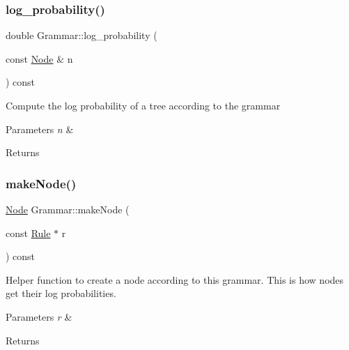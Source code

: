 \subsubsection{\texorpdfstring{log\+\_\+probability()}{log\_probability()}}
{\footnotesize\ttfamily double Grammar\+::log\+\_\+probability (\begin{DoxyParamCaption}\item[{const \hyperlink{class_node}{Node} \&}]{n }\end{DoxyParamCaption}) const\hspace{0.3cm}{\ttfamily [inline]}}

Compute the log probability of a tree according to the grammar 
\begin{DoxyParams}{Parameters}
{\em n} & \\
\hline
\end{DoxyParams}
\begin{DoxyReturn}{Returns}

\end{DoxyReturn}
\mbox{\label{class_grammar_a5d60795be5b288d74a87f2cc52008f71}} 
\subsubsection{\texorpdfstring{make\+Node()}{makeNode()}}
{\footnotesize\ttfamily \hyperlink{class_node}{Node} Grammar\+::make\+Node (\begin{DoxyParamCaption}\item[{const \hyperlink{class_rule}{Rule} $\ast$}]{r }\end{DoxyParamCaption}) const\hspace{0.3cm}{\ttfamily [inline]}}

Helper function to create a node according to this grammar. This is how nodes get their log probabilities. 
\begin{DoxyParams}{Parameters}
{\em r} & \\
\hline
\end{DoxyParams}
\begin{DoxyReturn}{Returns}

\end{DoxyReturn}
\mbox{\label{class_grammar_ae9115c2743b054ec44ef513843d84f5d}} 
